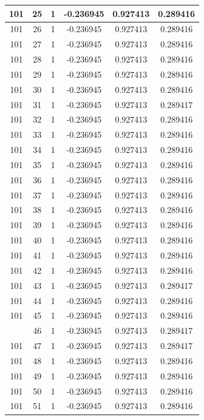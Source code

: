 \documentclass[12pt,a4paper]{article}
\numberwithin{equation}{section}
\numberwithin{figure}{section}
\numberwithin{table}{section}
\begin{document}
\begin{longtable}{|c|c|c|c|c|c|}
101 & 25 & 1 & -0.236945 & 0.927413 & 0.289416 \\ \hline
101 & 26 & 1 & -0.236945 & 0.927413 & 0.289416 \\ \hline
101 & 27 & 1 & -0.236945 & 0.927413 & 0.289416 \\ \hline
101 & 28 & 1 & -0.236945 & 0.927413 & 0.289416 \\ \hline
101 & 29 & 1 & -0.236945 & 0.927413 & 0.289416 \\ \hline
101 & 30 & 1 & -0.236945 & 0.927413 & 0.289416 \\ \hline
101 & 31 & 1 & -0.236945 & 0.927413 & 0.289417 \\ \hline
101 & 32 & 1 & -0.236945 & 0.927413 & 0.289416 \\ \hline
101 & 33 & 1 & -0.236945 & 0.927413 & 0.289416 \\ \hline
101 & 34 & 1 & -0.236945 & 0.927413 & 0.289416 \\ \hline
101 & 35 & 1 & -0.236945 & 0.927413 & 0.289416 \\ \hline
101 & 36 & 1 & -0.236945 & 0.927413 & 0.289416 \\ \hline
101 & 37 & 1 & -0.236945 & 0.927413 & 0.289416 \\ \hline
101 & 38 & 1 & -0.236945 & 0.927413 & 0.289416 \\ \hline
101 & 39 & 1 & -0.236945 & 0.927413 & 0.289416 \\ \hline
101 & 40 & 1 & -0.236945 & 0.927413 & 0.289416 \\ \hline
101 & 41 & 1 & -0.236945 & 0.927413 & 0.289416 \\ \hline
101 & 42 & 1 & -0.236945 & 0.927413 & 0.289416 \\ \hline
101 & 43 & 1 & -0.236945 & 0.927413 & 0.289417 \\ \hline
101 & 44 & 1 & -0.236945 & 0.927413 & 0.289416 \\ \hline
101 & 45 & 1 & -0.236945 & 0.927413 & 0.289416 \\ \hline
\pagebreak
101 & 46 & 1 & -0.236945 & 0.927413 & 0.289417 \\ \hline
101 & 47 & 1 & -0.236945 & 0.927413 & 0.289417 \\ \hline
101 & 48 & 1 & -0.236945 & 0.927413 & 0.289416 \\ \hline
101 & 49 & 1 & -0.236945 & 0.927413 & 0.289416 \\ \hline
101 & 50 & 1 & -0.236945 & 0.927413 & 0.289416 \\ \hline
101 & 51 & 1 & -0.236945 & 0.927413 & 0.289416 \\ \hline

\end{longtable}
\end{document}
